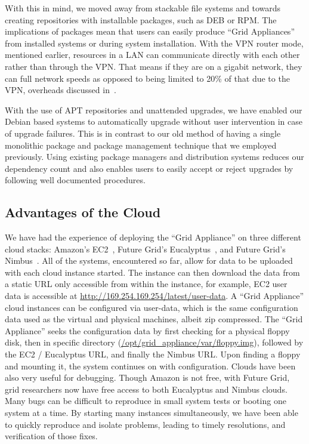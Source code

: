 \documentclass[twocolumn]{svjour3}
\begin{document}
With this in mind, we moved away from stackable file systems and towards
creating repositories with installable packages, such as DEB or RPM.  The
implications of packages mean that users can easily produce ``Grid Appliances''
from installed systems or during system installation.  With the VPN router
mode, mentioned earlier, resources in a LAN can communicate directly with each
other rather than through the VPN.  That means if they are on a gigabit
network, they can full network speeds as opposed to being limited to 20\% of
that due to the VPN, overheads discussed in~\cite{sc09}.

With the use of APT repositories and unattended upgrades, we have enabled our
Debian based systems to automatically upgrade without user intervention in case
of upgrade failures.  This is in contrast to our old method of having a single
monolithic package and package management technique that we employed
previously.  Using existing package managers and distribution systems reduces
our dependency count and also enables users to easily accept or reject upgrades
by following well documented procedures.

\subsection{Advantages of the Cloud}

We have had the experience of deploying the ``Grid Appliance'' on three
different cloud stacks:  Amazon's EC2~\cite{ec2}, Future Grid's
Eucalyptus~\cite{eucalyptus}, and Future Grid's Nimbus~\cite{nimbus}.  All of
the systems, encountered so far, allow for data to be uploaded with each cloud
instance started.  The instance can then download the data from a static URL
only accessible from within the instance, for example, EC2 user data is
accessible at \url{http://169.254.169.254/latest/user-data}. A ``Grid
Appliance'' cloud instances can be configured via user-data, which is the same
configuration data used as the virtual and physical machines, albeit zip
compressed.  The ``Grid Appliance'' seeks the configuration data by first
checking for a physical floppy disk, then in specific directory
(\url{/opt/grid_appliance/var/floppy.img}), followed by the EC2 / Eucalyptus
URL, and finally the Nimbus URL.  Upon finding a floppy and mounting it, the
system continues on with configuration.  Clouds have been also very useful for
debugging.  Though Amazon is not free, with Future Grid, grid researchers now
have free access to both Eucalyptus and Nimbus clouds.  Many bugs can be
difficult to reproduce in small system tests or booting one system at a time.
By starting many instances simultaneously, we have been able to quickly
reproduce and isolate problems, leading to timely resolutions, and verification
of those fixes.
\end{document}
